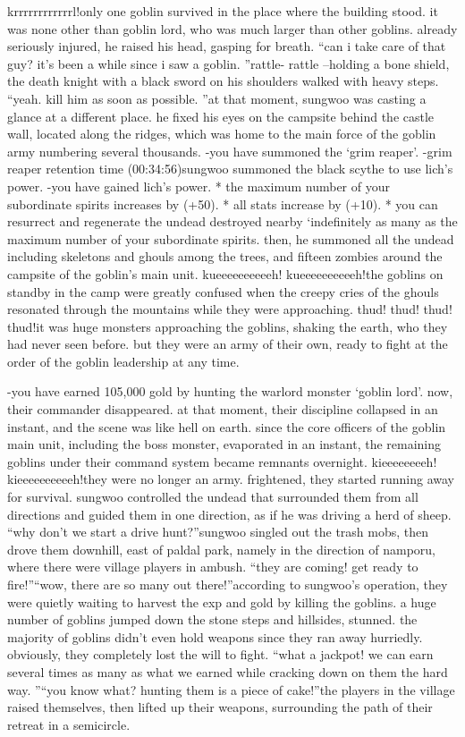 krrrrrrrrrrrrl!only one goblin survived in the place where the building stood.
 it was none other than goblin lord, who was much larger than other goblins.
 already seriously injured, he raised his head, gasping for breath.
“can i take care of that guy? it’s been a while since i saw a goblin.
”rattle- rattle –holding a bone shield, the death knight with a black sword on his shoulders walked with heavy steps.
“yeah.
 kill him as soon as possible.
”at that moment, sungwoo was casting a glance at a different place.
 he fixed his eyes on the campsite behind the castle wall, located along the ridges, which was home to the main force of the goblin army numbering several thousands.
-you have summoned the ‘grim reaper’.
-grim reaper retention time (00:34:56)sungwoo summoned the black scythe to use lich’s power.
-you have gained lich’s power.
* the maximum number of your subordinate spirits increases by (+50).
* all stats increase by (+10).
* you can resurrect and regenerate the undead destroyed nearby ‘indefinitely as many as the maximum number of your subordinate spirits.
then, he summoned all the undead including skeletons and ghouls among the trees, and fifteen zombies around the campsite of the goblin’s main unit.
kueeeeeeeeeeh! kueeeeeeeeeeh!the goblins on standby in the camp were greatly confused when the creepy cries of the ghouls resonated through the mountains while they were approaching.
thud! thud! thud! thud!it was huge monsters approaching the goblins, shaking the earth, who they had never seen before.
but they were an army of their own, ready to fight at the order of the goblin leadership at any time.


-you have earned 105,000 gold by hunting the warlord monster ‘goblin lord’.
now, their commander disappeared.
at that moment, their discipline collapsed in an instant, and the scene was like hell on earth.
since the core officers of the goblin main unit, including the boss monster, evaporated in an instant, the remaining goblins under their command system became remnants overnight.
kieeeeeeeeh! kieeeeeeeeeeh!they were no longer an army.
 frightened, they started running away for survival.
sungwoo controlled the undead that surrounded them from all directions and guided them in one direction, as if he was driving a herd of sheep.
“why don’t we start a drive hunt?”sungwoo singled out the trash mobs, then drove them downhill, east of paldal park, namely in the direction of namporu, where there were village players in ambush.
“they are coming! get ready to fire!”“wow, there are so many out there!”according to sungwoo’s operation, they were quietly waiting to harvest the exp and gold by killing the goblins.
a huge number of goblins jumped down the stone steps and hillsides, stunned.
the majority of goblins didn’t even hold weapons since they ran away hurriedly.
 obviously, they completely lost the will to fight.
“what a jackpot! we can earn several times as many as what we earned while cracking down on them the hard way.
”“you know what? hunting them is a piece of cake!”the players in the village raised themselves, then lifted up their weapons, surrounding the path of their retreat in a semicircle.


 